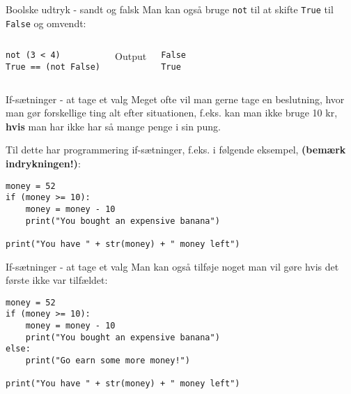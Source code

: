 \documentclass[main.tex]{subfiles}
\begin{document}
\begin{frame}[fragile]{Boolske udtryk - sandt og falsk}
	Man kan også bruge \texttt{not} til at skifte \texttt{True} til \texttt{False} og omvendt:
	\begin{columns}
		\begin{lstlisting}[style=python]
not (3 < 4)
True == (not False)
		\end{lstlisting}
		\pause
		Output
		\begin{lstlisting}[style=python]
False
True
		\end{lstlisting}
	\end{columns}
\end{frame}



\begin{frame}[fragile]{If-sætninger - at tage et valg}
	Meget ofte vil man gerne tage en beslutning, hvor man gør forskellige ting alt efter situationen, f.eks. kan man ikke bruge 10 kr, \textbf{hvis} man har ikke har så mange penge i sin pung.
	
	Til dette har programmering if-sætninger, f.eks. i følgende eksempel, \textbf{(bemærk indrykningen!)}:
	\begin{lstlisting}[style=python]
money = 52
if (money >= 10):
    money = money - 10
    print("You bought an expensive banana")
		
print("You have " + str(money) + " money left")
	\end{lstlisting}
\end{frame}


\begin{frame}[fragile]{If-sætninger - at tage et valg}
Man kan også tilføje noget man vil gøre hvis det første ikke var tilfældet:

\begin{lstlisting}[style=python]
money = 52
if (money >= 10):
	money = money - 10
	print("You bought an expensive banana")
else:
	print("Go earn some more money!")

print("You have " + str(money) + " money left")
\end{lstlisting}
\end{frame}
\end{document}
